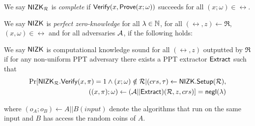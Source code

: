 \begin{definition}\label{def:nizk_completeness}
	We say ${\mathsf{NIZK}}_\mathcal{R}$ is {\em complete} if ${\mathsf{Verify}}(x, {\mathsf{Prove}}(x; \omega))$ succeeds for all $(x; \omega) \in \rel$.  %
\end{definition}

\def\advV{\ensuremath{V^*}\xspace} %

\begin{definition}\label{def:nizk_zero_knowledge}
	We say ${\mathsf{NIZK}}$ is {\em perfect zero-knowledge} for all $ \lambda \in \mathbb{N} $, for all $ (\rel,z) \leftarrow \mathfrak{R} $, $ (x,\omega) \in \rel $ and for all adversaries $ \mathcal{A} $, if the following holds:
	\allowbreak
	\doublecolumn{\begin{align*}
		\Pr[& \adv(\crs, z, \pi,\rel) = 1 \ | \ (\crs, \tau) \leftarrow \NIZK.\Setup (\rel),  \\\nonumber
		& \pi \leftarrow \NIZK_\rel.\Prove (x;\omega)]\\
		=\Pr[& \adv(\crs, z, \pi,\rel) = 1 \ | \ (\crs, \tau) \leftarrow \NIZK.\Setup (\rel), \\\nonumber
		&  \pi \leftarrow \NIZK_\rel.\Simulate (\tau,x)]
	\end{align*}
}{\begin{align*}
	\Pr[& \adv(\crs, z, \pi,\rel) = 1 \ | \ (\crs, \tau) \leftarrow \NIZK.\Setup (\rel),   \pi \leftarrow \NIZK_\rel.\Prove (x;\omega)]\\
	=\Pr[& \adv(\crs, z, \pi,\rel) = 1 \ | \ (\crs, \tau) \leftarrow \NIZK.\Setup (\rel),   \pi \leftarrow \NIZK_\rel.\Simulate (\tau,x)]
\end{align*}}
	
\end{definition}

\def\advP{\ensuremath{P^*}\xspace} %

\begin{definition}\label{def:nizk_knowledge_sound}
	We say ${\mathsf{NIZK}}$ is {computational knowledge sound} for all $ (\rel,z)  $ outputted by $ \mathfrak{R} $ if
	for any non-uniform PPT adversary \adv there exists a PPT extractor $ {\mathsf{Extract}} $
	such that
	\begin{align}
		\Pr[{\mathsf{NIZK}}_\mathcal{R}.{\mathsf{Verify}}(x,\pi) = 1 \wedge  (x;\omega) \notin \mathcal{R} | (crs,\tau) \leftarrow {\ensuremath{\mathsf{NIZK}}}.{\mathsf{Setup}}(\mathcal{R}),\nonumber\\ ((x,\pi);\omega)\leftarrow (\mathcal{A}||{\mathsf{Extract}})(\mathcal{R},z,crs)] =  \mathsf{negl}(\lambda) \nonumber
	\end{align}
	
	where $ (o_A;o_B)\leftarrow A||B(input) $ denote the algorithms that run on the same input and $ B $ has access the random coins of $ A $.
\end{definition}

